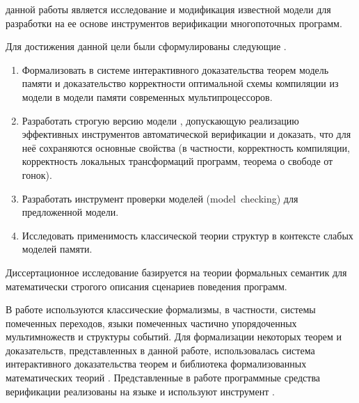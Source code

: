 {\aim} данной работы является  исследование и
модификация известной модели \Wkm для разработки
на ее основе инструментов верификации многопоточных программ. 

Для достижения данной цели были сформулированы следующие {\tasks}.
\begin{enumerate}[beginpenalty=10000] %
  \item
    Формализовать в системе интерактивного доказательства теорем \coq модель памяти \Wkm и
    доказательство корректности оптимальной схемы компиляции
    из модели \Wkm в модели памяти современных мультипроцессоров.
  \item
    Разработать строгую версию модели \Wkm, 
    допускающую реализацию эффективных инструментов автоматической верификации
    и доказать, что для неё сохраняются основные свойства \Wkm  
    (в частности, корректность компиляции, корректность локальных трансформаций программ, 
     теорема о свободе от гонок).
  \item
    Разработать инструмент проверки моделей (model~checking) для предложенной модели.
  \item
    Исследовать применимость классической теории структур в контексте слабых моделей памяти.
\end{enumerate}


{\methods} Диссертационное исследование базируется на теории формальных семантик
для математически строгого описания сценариев поведения  программ. 


В работе используются классические формализмы, в частности, 
системы помеченных переходов, языки помеченных частично 
упорядоченных мультимножеств и структуры событий. Для формализации некоторых теорем и доказательств, представленных в данной работе, 
использовалась система интерактивного доказательства теорем \coq 
и библиотека формализованных математических теорий \mathcomp. Представленные в работе  программные средства верификации  реализованы на языке \CLANG и используют инструмент \genmc.  



